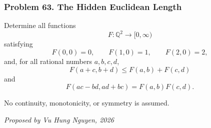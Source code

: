 \subsubsection*{Problem 63. The Hidden Euclidean Length}

\begin{exercisebox}[hard]

Determine all functions
\[
F:\mathbb Q^2\to[0,\infty)
\]
satisfying
\[
F(0,0)=0,\qquad F(1,0)=1,\qquad F(2,0)=2,
\]
and, for all rational numbers $a,b,c,d$,
\[
\boxed{
F(a+c,b+d)\le F(a,b)+F(c,d)
}
\tag{1}
\]
and
\[
\boxed{
F(ac-bd,ad+bc)=F(a,b)F(c,d).
}
\tag{2}
\]

No continuity, monotonicity, or symmetry is assumed.

\begin{flushright}
\textit{Proposed by Vu Hung Nguyen, 2026}
\end{flushright}


\end{exercisebox}
